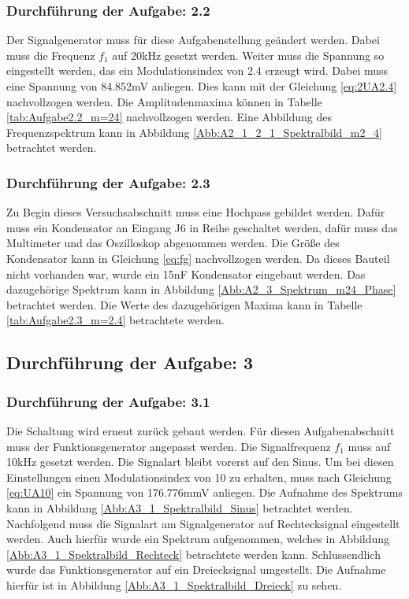 \documentclass[12pt]{scrartcl}
\begin{document}
\subsubsection*{Durchführung der Aufgabe: 2.2}
Der Signalgenerator muss für diese Aufgabenstellung geändert werden. 
Dabei muss die Frequenz $f_1$ auf 20kHz gesetzt werden. 
Weiter muss die Spannung so eingestellt werden, das ein Modulationsindex von 2.4 erzeugt wird. 
Dabei muss eine Spannung von 84.852mV anliegen. 
Dies kann mit der Gleichung \ref{eq:2UA2.4} nachvollzogen werden. 
Die Amplitudenmaxima können in Tabelle \ref{tab:Aufgabe2.2_m=24} nachvollzogen werden. 
Eine Abbildung des Frequenzspektrum kann in Abbildung \ref{Abb:A2_1_2_1_Spektralbild_m2_4} betrachtet werden.




\subsubsection*{Durchführung der Aufgabe: 2.3}
Zu Begin dieses Versuchsabschnitt muss eine Hochpass gebildet werden. 
Dafür muss ein Kondensator an Eingang J6 in Reihe geschaltet werden, dafür muss das Multimeter und das Oszilloskop abgenommen werden.
Die Größe des Kondensator kann in Gleichung \ref{eq:fg} nachvollzogen werden. 
Da dieses Bauteil nicht vorhanden war, wurde ein 15nF Kondensator eingebaut werden.
Das dazugehörige Spektrum kann in Abbildung \ref{Abb:A2_3_Spektrum_m24_Phase} betrachtet werden.
Die Werte des dazugehörigen Maxima kann in Tabelle \ref{tab:Aufgabe2.3_m=2.4} betrachtete werden.




\subsection{Durchführung der Aufgabe: 3}
\subsubsection*{Durchführung der Aufgabe: 3.1}
Die Schaltung wird erneut zurück gebaut werden.
Für diesen Aufgabenabschnitt muss der Funktionsgenerator angepasst werden. 
Die Signalfrequenz $f_1$ muss auf 10kHz gesetzt werden. 
Die Signalart bleibt vorerst auf den Sinus.
Um bei diesen Einstellungen einen Modulationsindex von 10 zu erhalten, muss nach Gleichung \ref{eq:UA10} ein Spannung von 176.776mmV anliegen.
Die Aufnahme des Spektrums kann in Abbildung \ref{Abb:A3_1_Spektralbild_Sinus} betrachtet werden.\\
Nachfolgend muss die Signalart am Signalgenerator auf Rechtecksignal eingestellt werden. 
Auch hierfür wurde ein Spektrum aufgenommen, welches in Abbildung \ref{Abb:A3_1_Spektralbild_Rechteck} betrachtete werden kann. 
Schlussendlich wurde das Funktionsgenerator auf ein Dreiecksignal umgestellt. 
Die Aufnahme hierfür ist in Abbildung \ref{Abb:A3_1_Spektralbild_Dreieck} zu sehen.
\end{document}
